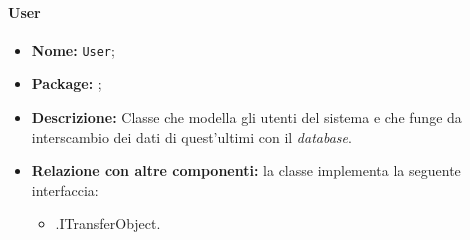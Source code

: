 \paragraph{User}
\begin{itemize}
\item \textbf{Nome:} \texttt{User};
\item \textbf{Package:} \texttt{\smodel{}};
\item \textbf{Descrizione:} Classe che modella gli utenti del sistema e che funge da interscambio dei dati di quest'ultimi con il \textit{database}.
\item \textbf{Relazione con altre componenti:} la classe implementa la seguente interfaccia:
		\begin{itemize}
			\item \smodel{}.ITransferObject.
		\end{itemize}
\end{itemize}
